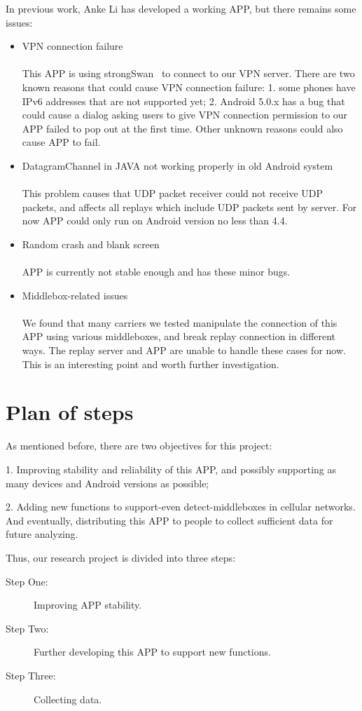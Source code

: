 \documentclass[letterpaper]{sig-alternate-10pt}
\begin{document}
In previous work, Anke Li has developed a working APP, but there remains some issues:
\begin{itemize}
  \item VPN connection failure\\\\
  This APP is using strongSwan~\cite{strongSwan} to connect to our VPN server. There are two known reasons that could cause VPN connection failure: 1. some phones have IPv6 addresses that are not supported yet; 2. Android 5.0.x has a bug that could cause a dialog asking users to give VPN connection permission to our APP failed to pop out at the first time. Other unknown reasons could also cause APP to fail.
  \item DatagramChannel in JAVA not working properly in old Android system\\\\
  This problem causes that UDP packet receiver could not receive UDP packets, and affects all replays which include UDP packets sent by server. For now APP could only run on Android version no less than 4.4.
  \item Random crash and blank screen\\\\
  APP is currently not stable enough and has these minor bugs.
  \item Middlebox-related issues\\\\
  We found that many carriers we tested manipulate the connection of this APP using various middleboxes, and break replay connection in different ways. The replay server and APP are unable to handle these cases for now. This is an interesting point and worth further investigation.
\end{itemize}

\section{Plan of steps}
As mentioned before, there are two objectives for this project:

1. Improving stability and reliability of this APP, and possibly supporting as many devices and Android versions as possible;

2. Adding new functions to support-even detect-middleboxes in cellular networks.
And eventually, distributing this APP to people to collect sufficient data for future analyzing.

Thus, our research project is divided into three steps:
\begin{description}
  \item[Step One:] Improving APP stability.
  \item[Step Two:] Further developing this APP to support new functions.
  \item[Step Three:] Collecting data.
\end{description}
\end{document}
